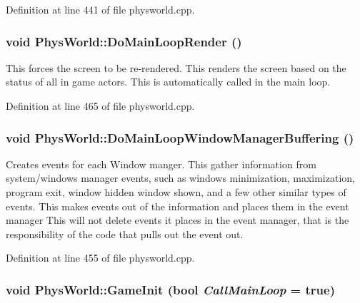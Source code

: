 Definition at line 441 of file physworld.cpp.\hypertarget{classPhysWorld_a8f33541d67164a2452e568443e9905be}{
\subsubsection[{DoMainLoopRender}]{\setlength{\rightskip}{0pt plus 5cm}void PhysWorld::DoMainLoopRender ()}}
\label{db/df5/classPhysWorld_a8f33541d67164a2452e568443e9905be}


This forces the screen to be re-\/rendered. This renders the screen based on the status of all in game actors. This is automatically called in the main loop. 

Definition at line 465 of file physworld.cpp.\hypertarget{classPhysWorld_ae81bab7f314d98f7b787c508e60c9c9a}{
\subsubsection[{DoMainLoopWindowManagerBuffering}]{\setlength{\rightskip}{0pt plus 5cm}void PhysWorld::DoMainLoopWindowManagerBuffering ()}}
\label{db/df5/classPhysWorld_ae81bab7f314d98f7b787c508e60c9c9a}


Creates events for each Window manger. This gather information from system/windows manager events, such as windows minimization, maximization, program exit, window hidden window shown, and a few other similar types of events. This makes events out of the information and places them in the event manager This will not delete events it places in the event manager, that is the responsibility of the code that pulls out the event out. 

Definition at line 455 of file physworld.cpp.\hypertarget{classPhysWorld_afc5116f97cc1e91e899d1a1ca7e14e9b}{
\subsubsection[{GameInit}]{\setlength{\rightskip}{0pt plus 5cm}void PhysWorld::GameInit (bool {\em CallMainLoop} = {\ttfamily true})}}
\label{db/df5/classPhysWorld_afc5116f97cc1e91e899d1a1ca7e14e9b}


